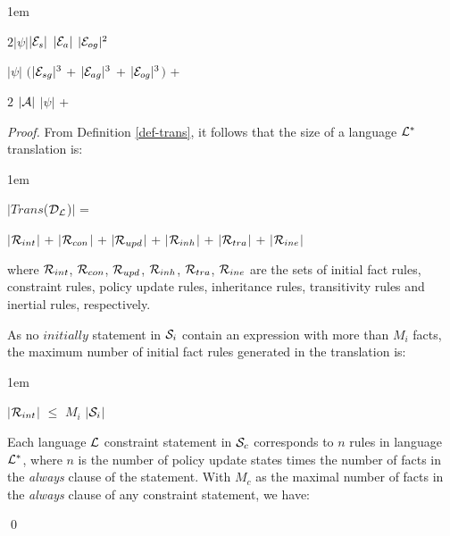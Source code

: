 \documentclass[global,twocolumn,final]{svjour}
\newenvironment{vtheorem}[1]
  {\begin{theorem}[#1]\hspace{0.25em}}
  {\end{theorem}}
\newenvironment{vproof}
  {\begin{proof}\hspace{0.25em}}
  {\qed\end{proof}}
\newenvironment{vquote}
  {\begin{list}{}{\leftmargin 1em}\item[]}
  {\end{list}}
\begin{document}
\begin{vtheorem}{Translation Size}
\begin{vquote}
            \hspace{1em}
            $2|\psi|$$|{\cal E}_{s}|$ $|{\cal E}_{a}|$ $|{\cal E}_{og}|^{2}$

            \hspace{1em}
            $|\psi|$ $($$|{\cal E}_{sg}|^{3}$ +
            $|{\cal E}_{ag}|^{3}$ +
            $|{\cal E}_{og}|^{3}$$)$ +

            \hspace{1em}
            $2$ $|{\cal A}|$ $|\psi|$ +
          \end{vquote}
        \end{vtheorem}

        \begin{vproof}
          From Definition \ref{def-trans}, it follows that the size of a
          language ${\cal L}^{*}$ translation is:

          \begin{vquote}
            $|$$Trans$(${\cal D_{L}}$)$|$ =

            \hspace{1em}
            $|$${\cal R}_{int}$$|$ +
            $|$${\cal R}_{con}$$|$ +
            $|$${\cal R}_{upd}$$|$ +
            $|$${\cal R}_{inh}$$|$ +
            $|$${\cal R}_{tra}$$|$ +
            $|$${\cal R}_{ine}$$|$
          \end{vquote}

          where ${\cal R}_{int}$, ${\cal R}_{con}$, ${\cal R}_{upd}$,
          ${\cal R}_{inh}$, ${\cal R}_{tra}$, ${\cal R}_{ine}$ are the sets of
          initial fact rules, constraint rules, policy update rules,
          inheritance rules, transitivity rules and inertial rules,
          respectively.

          As no $initially$ statement in ${\cal S}_{i}$ contain an expression
          with more than $M_{i}$ facts, the maximum number of initial fact
          rules generated in the translation is:

          \begin{vquote}
            $|$${\cal R}_{int}$$|$ $\leq$ $M_{i}$ $|$${\cal S}_{i}$$|$
          \end{vquote}

          Each language ${\cal L}$ constraint statement in ${\cal S}_{c}$
          corresponds to $n$ rules in language ${\cal L}^{*}$, where $n$ is
          the number of policy update states times the number of facts in the
          {\em always} clause of the statement. With $M_{c}$ as the maximal
          number of facts in the {\em always} clause of any constraint
          statement, we have:


\end{vproof}
\end{document}

